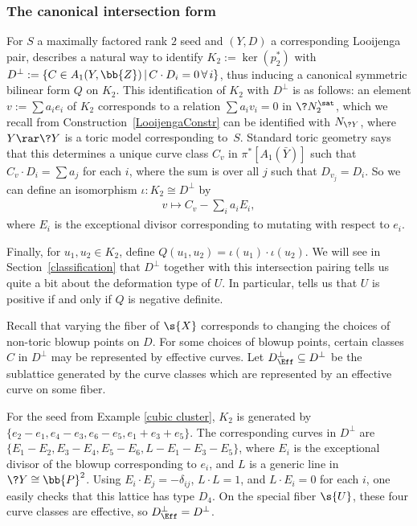 \subsubsection{The canonical intersection form}\label{canonical intersection}

For $S$ a maximally factored rank $2$ seed and $(Y,D)$ a corresponding Looijenga pair, \cite{GHK3} describes a natural way to identify $K_2:=\ker(p_2^*)$ with $D^{\perp}:=\{C\in A_1(Y,\bb{Z})\,|\,C\cdot D_i =0 \,\forall\,i\}$, thus inducing a canonical symmetric bilinear form $Q$ on $K_2$. This identification of $K_2$ with $D^{\perp}$ is as follows: an element $v:=\sum a_i e_i$ of $K_2$ corresponds to a relation $\sum a_{i} v_i = 0$ in $\?{N}_2^{\sat}$, which we recall from Construction~\ref{LooijengaConstr} can be identified with $N_{\?{Y}}$, where $Y\rar \?{Y}$ is a toric model corresponding to~$S$. Standard toric geometry says that this determines a unique curve class $C_v$ in $\pi^{*}[A_1(\bar{Y})]$ such that $C_v\cdot D_i = \sum a_{j}$ for each $i$, where the sum is over all $j$ such that $D_{v_j}=D_i$. So we can define an isomorphism $\iota\colon K_2 \cong D^{\perp}$ by
\begin{gather*}
	v\mapsto C_v - \sum_i a_{i} E_{i},
\end{gather*}
where $E_i$ is the exceptional divisor corresponding to mutating with respect to $e_i$.

Finally, for $u_1,u_2 \in K_2$, define $Q(u_1,u_2) = \iota(u_1) \cdot \iota(u_2)$. We will see in Section~\ref{classification} that $D^{\perp}$ together with this intersection pairing tells us quite a bit about the deformation type of $U$. In particular, \cite{GHK3} tells us that $U$ is positive if and only if $Q$ is negative definite.

Recall that varying the fiber of $\s{X}$ corresponds to changing the choices of non-toric blowup points on $D$. For some choices of blowup points, certain classes $C$ in $D^{\perp}$ may be represented by effective curves. Let $D^{\perp}_{\Eff} \subseteq D^{\perp}$ be the sublattice generated by the curve classes which are represented by an effective curve on some fiber.

\begin{eg}For the seed from Example \ref{cubic cluster}, $K_2$ is generated by $\{e_2-e_1,e_4-e_3,e_6-e_5,e_1+e_3+e_5\}$. The corresponding curves in $D^{\perp}$ are $\{E_1-E_2,E_3-E_4,E_5-E_6,L-E_1-E_3-E_5\}$, where $E_i$ is the exceptional divisor of the blowup corresponding to $e_i$, and $L$ is a generic line in $\?{Y}\cong \bb{P}^2$. Using $E_i\cdot E_j = -\delta_{ij}$, $L\cdot L=1$, and $L\cdot E_i=0$ for each $i$, one easily checks that this lattice has type $D_4$. On the special fiber $\s{U}$, these four curve classes are effective, so $D^{\perp}_{\Eff} = D^{\perp}$.
\end{eg}

